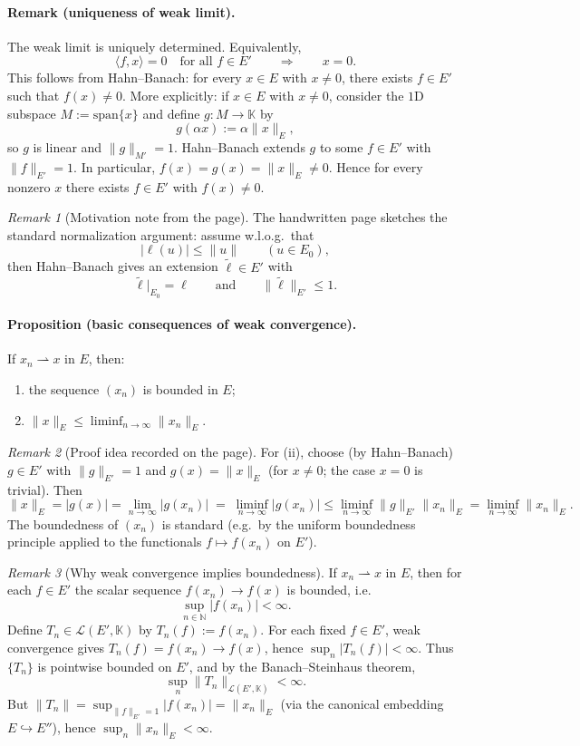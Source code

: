 \documentclass[11pt]{article}
\theoremstyle{definition}
\theoremstyle{remark}
\newtheorem{remark}{Remark}
\begin{document}
\paragraph{Remark (uniqueness of weak limit).}
The weak limit is uniquely determined. Equivalently,
\[
\langle f,x\rangle = 0 \quad \text{for all } f\in E'
\qquad\Longrightarrow\qquad
x=0.
\]
This follows from Hahn--Banach: for every $x\in E$ with $x\neq 0$, there exists $f\in E'$ such that $f(x)\neq 0$.
\noindent
More explicitly: if $x\in E$ with $x\neq 0$, consider the $1$D subspace $M:=\mathrm{span}\{x\}$ and define $g\colon M\to \mathbb{K}$ by
\[
g(\alpha x):=\alpha\|x\|_E,
\]
so $g$ is linear and $\|g\|_{M'}=1$. Hahn--Banach extends $g$ to some $f\in E'$ with $\|f\|_{E'}=1$. In particular, $f(x)=g(x)=\|x\|_E\neq 0$.
Hence for every nonzero $x$ there exists $f\in E'$ with $f(x)\neq 0$.

\begin{remark}[Motivation note from the page]
The handwritten page sketches the standard normalization argument: assume w.l.o.g.\ that
\[
|\ell(u)|\le \|u\| \qquad (u\in E_0),
\]
then Hahn--Banach gives an extension $\widetilde{\ell}\in E'$ with
\[
\widetilde{\ell}|_{E_0}=\ell
\qquad\text{and}\qquad
\|\widetilde{\ell}\|_{E'}\le 1.
\]
\end{remark}

\paragraph{Proposition (basic consequences of weak convergence).}
If $x_n \rightharpoonup x$ in $E$, then:
\begin{enumerate}
\item the sequence $(x_n)$ is bounded in $E$;
\item $\|x\|_E \le \liminf_{n\to\infty}\|x_n\|_E$.
\end{enumerate}

\begin{remark}[Proof idea recorded on the page]
For (ii), choose (by Hahn--Banach) $g\in E'$ with $\|g\|_{E'}=1$ and $g(x)=\|x\|_E$ (for $x\neq 0$; the case $x=0$ is trivial). Then
\[
\|x\|_E
=
|g(x)|
=
\lim_{n\to\infty}|g(x_n)|
\;=\;
\liminf_{n\to\infty}|g(x_n)|
\le
\liminf_{n\to\infty}\|g\|_{E'}\|x_n\|_E
=
\liminf_{n\to\infty}\|x_n\|_E.
\]
The boundedness of $(x_n)$ is standard (e.g.\ by the uniform boundedness principle applied to the functionals $f\mapsto f(x_n)$ on $E'$).
\end{remark}

\begin{remark}[Why weak convergence implies boundedness]
If $x_n\rightharpoonup x$ in $E$, then for each $f\in E'$ the scalar sequence $f(x_n)\to f(x)$ is bounded, i.e.
\[
\sup_{n\in\mathbb{N}} |f(x_n)| < \infty.
\]
Define $T_n\in \mathcal{L}(E',\mathbb{K})$ by $T_n(f):=f(x_n)$. For each fixed $f\in E'$, weak convergence gives $T_n(f)=f(x_n)\to f(x)$, hence $\sup_n |T_n(f)|<\infty$. Thus $\{T_n\}$ is pointwise bounded on $E'$, and by the Banach--Steinhaus theorem,
\[
\sup_{n}\|T_n\|_{\mathcal{L}(E',\mathbb{K})}<\infty.
\]
But $\|T_n\|=\sup_{\|f\|_{E'}=1}|f(x_n)|=\|x_n\|_E$ (via the canonical embedding $E\hookrightarrow E''$), hence $\sup_n\|x_n\|_E<\infty$.
\end{remark}
\end{document}
